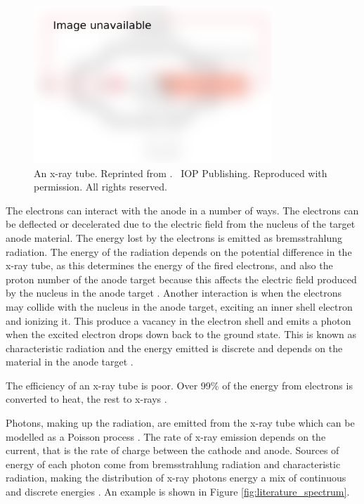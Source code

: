\begin{figure}
  \centering
  \includegraphics[width=0.8\textwidth]{../figures/literatureReview/literature_tube.png}
  \caption{An x-ray tube. Reprinted from \cite{michael2001x}. \textcopyright\ IOP Publishing. Reproduced with permission. All rights reserved.}
  \label{fig:literature_tube}
\end{figure}

The electrons can interact with the anode in a number of ways. The electrons can be deflected or decelerated due to the electric field from the nucleus of the target anode material. The energy lost by the electrons is emitted as bremsstrahlung radiation. The energy of the radiation depends on the potential difference in the x-ray tube, as this determines the energy of the fired electrons, and also the proton number of the anode target because this affects the electric field produced by the nucleus in the anode target \citep{sun2012overview}. Another interaction is when the electrons may collide with the nucleus in the anode target, exciting an inner shell electron and ionizing it. This produce a vacancy in the electron shell and emits a photon when the excited electron drops down back to the ground state. This is known as characteristic radiation and the energy emitted is discrete and depends on the material in the anode target \citep{sun2012overview}.

The efficiency of an x-ray tube is poor. Over 99\% of the energy from electrons is converted to heat, the rest to x-rays \citep{kruth2011computed}.

Photons, making up the radiation, are emitted from the x-ray tube which can be modelled as a Poisson process \citep{whiting2006properties, cierniak2011x}. The rate of x-ray emission depends on the current, that is the rate of charge between the cathode and anode. Sources of energy of each photon come from bremsstrahlung radiation and characteristic radiation, making the distribution of x-ray photons energy a mix of continuous and discrete energies \citep{sun2012overview}. An example is shown in Figure \ref{fig:literature_spectrum}.

